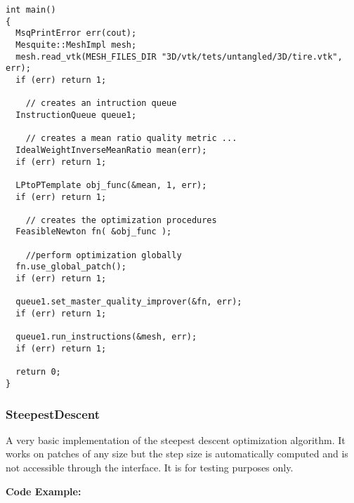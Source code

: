 \begin{lstlisting}[frame=single]
int main()
{     
  MsqPrintError err(cout);
  Mesquite::MeshImpl mesh;
  mesh.read_vtk(MESH_FILES_DIR "3D/vtk/tets/untangled/3D/tire.vtk", err);
  if (err) return 1;
  
    // creates an intruction queue
  InstructionQueue queue1;

    // creates a mean ratio quality metric ...
  IdealWeightInverseMeanRatio mean(err);
  if (err) return 1;
  
  LPtoPTemplate obj_func(&mean, 1, err);
  if (err) return 1;
  
    // creates the optimization procedures
  FeasibleNewton fn( &obj_func );

    //perform optimization globally
  fn.use_global_patch();
  if (err) return 1;
  
  queue1.set_master_quality_improver(&fn, err); 
  if (err) return 1;

  queue1.run_instructions(&mesh, err); 
  if (err) return 1;
  
  return 0;
}
\end{lstlisting}


\subsubsection{SteepestDescent}
A very basic implementation of the steepest descent optimization algorithm.  It works on patches of any size but the step size is automatically computed and is not accessible through the interface. It is for testing purposes only. 

\textbf{Code Example:}

